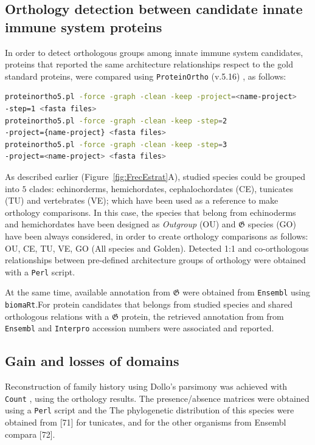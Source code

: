 \documentclass[11pt]{article}
\newcommand{\TODO}[1]{\begingroup\color{red}#1\endgroup}
\begin{document}
\subsection*{Orthology detection between candidate innate immune system 
proteins}
In order to detect orthologous groups among innate immune system candidates, 
proteins that reported the same architecture relationships respect to the gold 
standard proteins, were compared using \texttt{ProteinOrtho} (v.5.16) \cite{Lechner2011}, 
as follows:

\begin{lstlisting}[language=bash, breaklines=true]
proteinortho5.pl -force -graph -clean -keep -project=<name-project> 
-step=1 <fasta files>
proteinortho5.pl -force -graph -clean -keep -step=2 
-project={name-project} <fasta files>
proteinortho5.pl -force -graph -clean -keep -step=3  
-project=<name-project> <fasta files>
\end{lstlisting}

As described earlier (Figure~\ref{fig:FrecEstrat}A), studied species could be grouped
into $5$ clades: echinorderms, hemichordates, cephalochordates (CE), tunicates (TU) and vertebrates 
(VE); which have been used as a reference to make orthology comparisons. In this case, the species that belong
from echinoderms and hemichordates have been designed as \textsl{Outgroup} (OU) and 
$\boldsymbol{\mathfrak{G}}$  species (GO) have been always considered, in order to create orthology
comparisons as follows: OU, CE, TU, VE, GO (All species and Golden). Detected 1:1 and 
co-orthologous relationships between pre-defined architecture groups of orthology 
were obtained with a \texttt{Perl} script.

At the same time, available annotation from $\boldsymbol{\mathfrak{G}}$ were obtained from 
\texttt{Ensembl} using \texttt{biomaRt}.For protein candidates that belongs from studied 
species and shared orthologous relations with a $\boldsymbol{\mathfrak{G}}$ protein, the 
retrieved annotation from from \texttt{Ensembl} and \texttt{Interpro} accession numbers were 
associated and reported.

\subsection*{Gain and losses of domains}

Reconstruction of family history using Dollo's parsimony was achieved with \texttt{Count} \cite{csuros2010}, using the orthology results. The presence/absence matrices were obtained using
a \texttt{Perl} script and the The phylogenetic distribution of this species 
were obtained from \TODO{[71]} for tunicates, and for the other organisms from 
Ensembl compara \TODO{[72]}.
\end{document}
